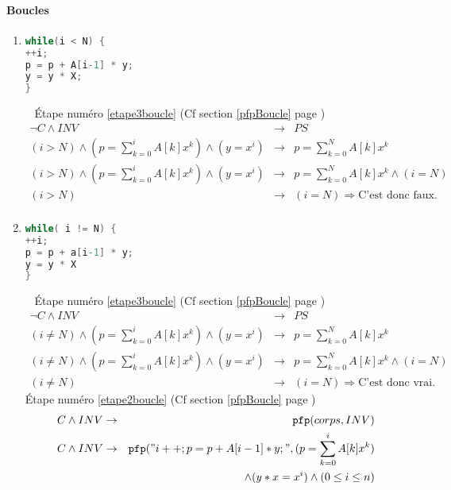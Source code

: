 \paragraph{Boucles} 
\begin{enumerate} 
	\item \begin{lstlisting}[language=C,numbers=none]
while(i < N) { 
++i; 
p = p + A[i-1] * y; 
y = y * X; 
}
	\end{lstlisting}~
	\'Etape numéro \ref{etape3boucle} (Cf section \ref{pfpBoucle} page \pageref{etape3boucle})
	\begin{eqnarray*}
		\neg C \wedge INV &\rightarrow& PS\\
		(i > N) \wedge (p = \sum^i_{k=0} A[k] x^k) \wedge(y=x^i) &\rightarrow& p = \sum^N_{k=0}A[k]x^k\\
		(i > N) \wedge (p = \sum^i_{k=0} A[k] x^k) \wedge(y=x^i) &\rightarrow& p = \sum^N_{k=0}A[k]x^k\wedge (i=N)\\
		(i > N) &\rightarrow& (i = N) \Rightarrow \textrm{C'est donc faux.}\\
	\end{eqnarray*}
	\item \begin{lstlisting}[language=C,numbers=none]
while( i != N) { 
++i; 
p = p + a[i-1] * y; 
y = y * X 
} 
\end{lstlisting}~
	\'Etape numéro \ref{etape3boucle} (Cf section \ref{pfpBoucle} page \pageref{etape3boucle})
	\begin{eqnarray*}
		\neg C \wedge INV &\rightarrow& PS\\
		(i \neq N) \wedge (p = \sum^i_{k=0} A[k] x^k) \wedge(y=x^i) &\rightarrow& p = \sum^N_{k=0}A[k]x^k\\
		(i \neq N) \wedge (p = \sum^i_{k=0} A[k] x^k) \wedge(y=x^i) &\rightarrow& p = \sum^N_{k=0}A[k]x^k\wedge (i=N)\\
		(i \neq N) &\rightarrow& (i = N) \Rightarrow \textrm{C'est donc vrai}. 
	\end{eqnarray*}
	\'Etape numéro \ref{etape2boucle} (Cf section \ref{pfpBoucle} page \pageref{etape3boucle})
	\begin{eqnarray*}
		C \wedge INV &\rightarrow& \pfp(corps, INV)\\
		C \wedge INV &\rightarrow& \pfp ("i++;p=p+A[i-1]*y;", (p=\sum^i_{k=0}A[k]x^k)\\&&\wedge(y*x=x^i)\wedge(0\leq i\leq n )\\

\end{eqnarray*}
\end{enumerate}
